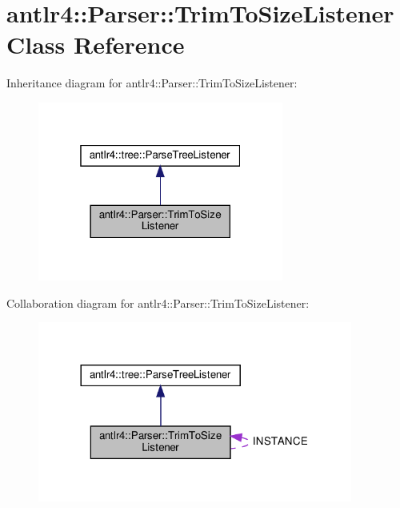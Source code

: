 \hypertarget{classantlr4_1_1Parser_1_1TrimToSizeListener}{}\section{antlr4\+:\+:Parser\+:\+:Trim\+To\+Size\+Listener Class Reference}
\label{classantlr4_1_1Parser_1_1TrimToSizeListener}


Inheritance diagram for antlr4\+:\+:Parser\+:\+:Trim\+To\+Size\+Listener\+:
\nopagebreak
\begin{figure}[H]
\begin{center}
\leavevmode
\includegraphics[width=229pt]{classantlr4_1_1Parser_1_1TrimToSizeListener__inherit__graph}
\end{center}
\end{figure}


Collaboration diagram for antlr4\+:\+:Parser\+:\+:Trim\+To\+Size\+Listener\+:
\nopagebreak
\begin{figure}[H]
\begin{center}
\leavevmode
\includegraphics[width=293pt]{classantlr4_1_1Parser_1_1TrimToSizeListener__coll__graph}
\end{center}
\end{figure}
